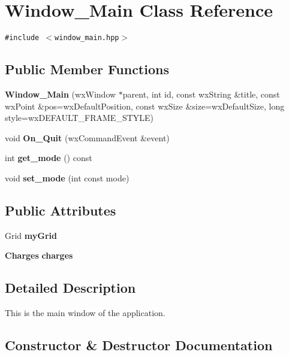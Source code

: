 \section{Window\_\-Main Class Reference}
\label{classWindow__Main}
{\tt \#include $<$window\_\-main.hpp$>$}

\subsection*{Public Member Functions}
\begin{CompactItemize}
\item 
{\bf Window\_\-Main} (wx\-Window $\ast$parent, int id, const wx\-String \&title, const wx\-Point \&pos=wx\-Default\-Position, const wx\-Size \&size=wx\-Default\-Size, long style=wx\-DEFAULT\_\-FRAME\_\-STYLE)
\item 
void {\bf On\_\-Quit} (wx\-Command\-Event \&event)\label{classWindow__Main_a1}

\item 
int {\bf get\_\-mode} () const \label{classWindow__Main_a2}

\item 
void {\bf set\_\-mode} (int const mode)\label{classWindow__Main_a3}

\end{CompactItemize}
\subsection*{Public Attributes}
\begin{CompactItemize}
\item 
Grid {\bf my\-Grid}\label{classWindow__Main_o0}

\item 
{\bf Charges} {\bf charges}\label{classWindow__Main_o1}

\end{CompactItemize}


\subsection{Detailed Description}
This is the main window of the application. 



\subsection{Constructor \& Destructor Documentation}
